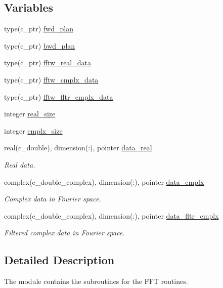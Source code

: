 \subsection*{Variables}
\begin{DoxyCompactItemize}
\item 
type(c\+\_\+ptr) \hyperlink{namespacem__fftw_af605e2137e55bfc3b5e95bbdad51803a}{fwd\+\_\+plan}
\item 
type(c\+\_\+ptr) \hyperlink{namespacem__fftw_a5120d0924ad190de0c0967cfdfdffb64}{bwd\+\_\+plan}
\item 
type(c\+\_\+ptr) \hyperlink{namespacem__fftw_a0db6f31d6d28b16d18982654bd98501a}{fftw\+\_\+real\+\_\+data}
\item 
type(c\+\_\+ptr) \hyperlink{namespacem__fftw_a5ec1a65aeb900c5fc0c437c04a15bb1c}{fftw\+\_\+cmplx\+\_\+data}
\item 
type(c\+\_\+ptr) \hyperlink{namespacem__fftw_acf83109d9518ac141074223356bc9385}{fftw\+\_\+fltr\+\_\+cmplx\+\_\+data}
\item 
integer \hyperlink{namespacem__fftw_a7963f79188a7191b7d8436707e2aa4a5}{real\+\_\+size}
\item 
integer \hyperlink{namespacem__fftw_afa99ee82497ae0ee316e97734ad0d7d3}{cmplx\+\_\+size}
\item 
real(c\+\_\+double), dimension(\+:), pointer \hyperlink{namespacem__fftw_a5fc31000de6fec8b2dc1a9a1259f8089}{data\+\_\+real}
\begin{DoxyCompactList}\small\item\em Real data. \end{DoxyCompactList}\item 
complex(c\+\_\+double\+\_\+complex), dimension(\+:), pointer \hyperlink{namespacem__fftw_a46b5b6c6849f50f0fe5f96301520e981}{data\+\_\+cmplx}
\begin{DoxyCompactList}\small\item\em Complex data in Fourier space. \end{DoxyCompactList}\item 
complex(c\+\_\+double\+\_\+complex), dimension(\+:), pointer \hyperlink{namespacem__fftw_a2baa49912c2585f5937bcb41804edc3a}{data\+\_\+fltr\+\_\+cmplx}
\begin{DoxyCompactList}\small\item\em Filtered complex data in Fourier space. \end{DoxyCompactList}\end{DoxyCompactItemize}


\subsection{Detailed Description}
The module contains the subroutines for the F\+FT routines. 

